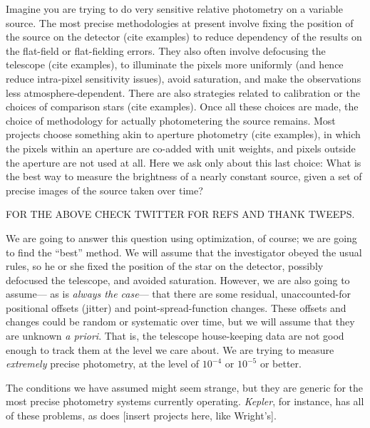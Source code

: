 \documentclass[12pt, letterpaper, preprint]{aastex}
\newcommand{\project}[1]{\textsl{#1}}
\newcommand{\foreign}[1]{\textsl{#1}}
\begin{document}
Imagine you are trying to do very sensitive relative photometry on a variable source.
The most precise methodologies at present involve fixing the position of the source on the detector
  (cite examples)
  to reduce dependency of the results on the flat-field or flat-fielding errors.
They also often involve defocusing the telescope
  (cite examples),
  to illuminate the pixels more uniformly
  (and hence reduce intra-pixel sensitivity issues),
  avoid saturation,
  and make the observations less atmosphere-dependent.
There are also strategies related to calibration or the choices of comparison stars
  (cite examples).
Once all these choices are made,
  the choice of methodology for actually photometering the source remains.
Most projects choose something akin to aperture photometry
  (cite examples),
  in which the pixels within an aperture are co-added with unit weights,
  and pixels outside the aperture are not used at all.
Here we ask only about this last choice:
What is the best way to measure the brightness of a nearly constant source,
  given a set of precise images of the source taken over time?

FOR THE ABOVE CHECK TWITTER FOR REFS AND THANK TWEEPS.

We are going to answer this question using optimization, of course;
  we are going to find the ``best'' method.
We will assume that the investigator obeyed the usual rules,
  so he or she fixed the position of the star on the detector,
  possibly defocused the telescope,
  and avoided saturation.
However, we are also going to assume---%
  as is \emph{always the case}---%
  that there are some residual,
  unaccounted-for positional offsets (jitter) and point-spread-function changes.
These offsets and changes could be random or systematic over time,
  but we will assume that they are unknown \foreign{a priori}.
That is, the telescope house-keeping data are not good enough to track them at the level we care about.
We are trying to measure \emph{extremely} precise photometry,
  at the level of $10^{-4}$ or $10^{-5}$ or better.

The conditions we have assumed might seem strange,
  but they are generic for the most precise photometry systems currently operating.
\project{Kepler}, for instance, has all of these problems,
  as does [insert projects here, like Wright's].
\end{document}
